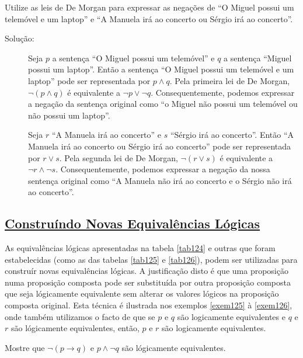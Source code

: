 \begin{exmp}
\label{exem124}
Utilize as leis de De Morgan para expressar as negações de ``O Miguel possui um
telemóvel e um laptop'' e ``A Manuela irá ao concerto ou Sérgio irá ao
concerto''.
\end{exmp}

\begin{description}
\item[Solução: ]Seja $p$ a sentença ``O Miguel possui um telemóvel'' e $q$ a
sentença ``Miguel possui um laptop''. Então a sentença ``O Miguel possui um
telemóvel e um laptop'' pode ser representada por $p \land q$. Pela primeira lei
de De Morgan, $\lnot (p \land q)$ é equivalente a $\lnot p \lor \lnot q$.
Consequentemente, podemos expressar a negação da sentença original como ``o
Miguel não possui um telemóvel ou não possui um laptop''.
\item[]Seja $r$ ``A Manuela irá ao concerto'' e $s$ ``Sérgio irá ao  concerto''.
Então ``A Manuela irá ao concerto ou Sérgio irá ao concerto'' pode ser
representada por $r \lor s$. Pela segunda lei de De Morgan, $\lnot (r \lor s)$ é
equivalente a $\lnot r \land \lnot s$. Consequentemente, podemos expressar a
negação da nossa sentença original como ``A Manuela não irá ao concerto e o
Sérgio não irá ao concerto''.
\end{description}


\subsection*{\underline{Construíndo Novas Equivalências Lógicas}}

As equivalências lógicas apresentadas na tabela \ref{tab124} e outras que
foram estabelecidas (como as das tabelas \ref{tab125} e \ref{tab126}),
podem ser utilizadas para construír novas equivalências lógicas. A justificação
disto é que uma proposição numa proposição composta pode ser substituída por
outra proposição composta que seja lógicamente equivalente sem alterar os
valores lógicos na proposição composta original. Esta técnica é ilustrada nos
exemplos \ref{exem125} à \ref{exem126}, onde também utilizamos o facto de que se
$p$ e $q$ são logicamente equivalentes e $q$ e $r$ são lógicamente equivalentes,
então, $p$ e $r$ são logicamente equivalentes.

\begin{exmp}
\label{exem125}
Mostre que $\lnot (p \to q)$ e $p \land \lnot q$ são lógicamente equivalentes.
\end{exmp}

